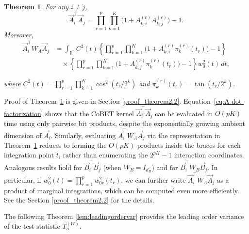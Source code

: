 \documentclass[12pt,reqno,oneside]{amsbook}
\newtheorem{theorem}{Theorem}[chapter]
\theoremstyle{definition}
\theoremstyle{remark}
\begin{document}
\begin{theorem}
\label{thm:computeATA}
For any $i\neq j$,
\begin{equation}
\label{eq:A-dot-factorization}
\vec A_i^\top \vec A_j
=
\prod_{r=1}^p\prod_{k=1}^K
\bigl(1 + A^{(r)}_{k,i}A^{(r)}_{k,j}\bigr)
-1 .
\end{equation}
Moreover,
\begin{align*}
\vec A_i^\top W_A \vec A_j
&=
\int_{\mathbb R^p}
C^2(t)
\left\{
\prod_{r=1}^p\prod_{k=1}^K
\bigl(1+A^{(r)}_{k,i}\pi_k^{(r)}(t_r)\bigr)
-1
\right\}
\\
&\quad\times
\left\{
\prod_{r=1}^p\prod_{k=1}^K
\bigl(1+A^{(r)}_{k,j}\pi_k^{(r)}(t_r)\bigr)
-1
\right\}
w_0^2(t)\,dt ,
\end{align*}

where
$C^2(t)=\prod_{r=1}^p\prod_{k=1}^K \cos^2(t_r/2^k)$
and
$\pi_k^{(r)}(t_r)=\tan(t_r/2^k)$.
\end{theorem}
Proof of Theorem~\ref{thm:computeATA} is given in Section \ref{proof_theorem2.2}.
Equation~\eqref{eq:A-dot-factorization} shows that the CoBET kernel
$\vec A_i^\top \vec A_j$ can be evaluated in $O(pK)$ time using only pairwise
bit products, despite the exponentially growing ambient dimension of $\vec A_i$.
Similarly, evaluating $\vec A_i^\top W_A \vec A_j$ via the representation in
Theorem~\ref{thm:computeATA} reduces to forming the $O(pK)$ products inside the
braces for each integration point $t$, rather than enumerating the
$2^{pK}-1$ interaction coordinates.
Analogous results hold for $\vec B_i^\top \vec B_j$ (when $W_B=I_{d_B}$)
and for $\vec B_i^\top W_B \vec B_j$. In particular, 
if $w_0^2(t)=\prod _{r=1}^p w_{0r}^2(t_r)$, we can further write
$\vec A_i^\top W_A \vec A_j$ as a product of marginal integrations, 
which can be computed even more efficiently. See the Section \ref{proof_theorem2.2} for the details.

The following Theorem \ref{lem:leadingordervar} provides the leading order variance of the test statistic $T_{n}^{(W)}$.
\end{document}
